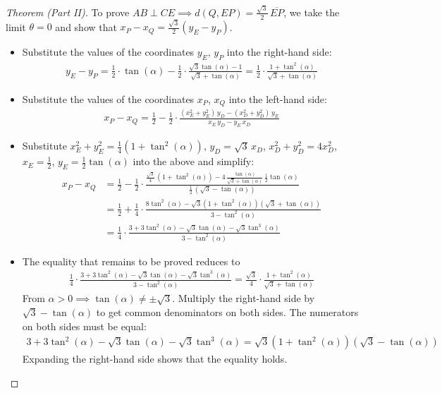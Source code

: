 \begin{proof}[Theorem (Part II)]
To prove $AB \perp CE \implies d(Q,EP)=\frac{\sqrt{3}}{2}\,\overline{EP}$, we take the limit $\theta=0$ and show that $x_{P}-x_{Q}=\frac{\sqrt{3}}{2} (y_{E}-y_{P})$.
\begin{itemize}
\item Substitute the values of the coordinates $y_{E}$, $y_{P}$ into the right-hand side:
\begin{align*}
y_{E} - y_{P} 
  = \frac{1}{2} \cdot \tan(\alpha) - \frac{1}{2} \cdot \frac{\sqrt{3}\tan(\alpha)-1}{\sqrt{3}+\tan(\alpha)}
  = \frac{1}{2} \cdot \frac{1 + \tan^{2}(\alpha)}{\sqrt{3}+\tan(\alpha)}
\end{align*}
\item Substitute the values of the coordinates $x_{P}$, $x_{Q}$ into the left-hand side:
\begin{align*}
x_{P} - x_{Q} 
  = \frac{1}{2} - \frac{1}{2} \cdot \frac{(x_{E}^{2}+y_{E}^{2}) \, y_{D} - (x_{D}^{2}+y_{D}^{2}) \, y_{E}}{x_{E} \, y_{D} - y_{E} \, x_{D}}
\end{align*}
\item Substitute $x_{E}^{2}+y_{E}^{2}=\frac{1}{4}(1+\tan^{2}(\alpha))$, $y_{D}=\sqrt{3}\,x_{D}$, $x_{D}^{2}+y_{D}^{2}=4x_{D}^{2}$, $x_{E}=\frac{1}{2}$, $y_{E}=\frac{1}{2}\tan(\alpha)$ into the above and simplify:
\begin{align*}
x_{P} - x_{Q} 
& = \frac{1}{2} - \frac{1}{2} \cdot \frac{\frac{\sqrt{3}}{4}\,(1+\tan^{2}(\alpha))-4\,\frac{\tan(\alpha)}{\sqrt{3}+\tan(\alpha)}\,\frac{1}{2}\tan(\alpha)}{\frac{1}{2}\,(\sqrt{3}-\tan(\alpha))}
\\[1ex]
& = \frac{1}{2} + \frac{1}{4} \cdot \frac{8\tan^{2}(\alpha)-\sqrt{3}(1+\tan^{2}(\alpha))(\sqrt{3}+\tan(\alpha))}{3-\tan^{2}(\alpha)}
\\[1ex]
& = \frac{1}{4} \cdot \frac{3+3\tan^{2}(\alpha)-\sqrt{3}\tan(\alpha)-\sqrt{3}\tan^{3}(\alpha)}{3-\tan^{2}(\alpha)}
\end{align*}
\item The equality that remains to be proved reduces to
\begin{align*}
\frac{1}{4} \cdot \frac{3+3\tan^{2}(\alpha)-\sqrt{3}\tan(\alpha)-\sqrt{3}\tan^{3}(\alpha)}{3-\tan^{2}(\alpha)}
= \frac{\sqrt{3}}{4} \cdot \frac{1 + \tan^{2}(\alpha)}{\sqrt{3}+\tan(\alpha)}
\end{align*}
From $\alpha>0 \implies \tan(\alpha)\ne\pm\sqrt{3}$. Multiply the right-hand side by $\sqrt{3}-\tan(\alpha)$ to get common denominators on both sides. The numerators on both sides must be equal:
\begin{align*}
3+3\tan^{2}(\alpha)-\sqrt{3}\tan(\alpha)-\sqrt{3}\tan^{3}(\alpha)
= \sqrt{3} (1+\tan^{2}(\alpha))(\sqrt{3}-\tan(\alpha))
\end{align*}
Expanding the right-hand side shows that the equality holds.
\end{itemize}
\end{proof}

